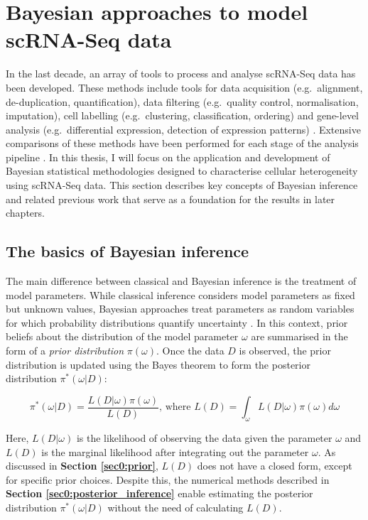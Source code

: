 
\section{Bayesian approaches to model scRNA-Seq data}

In the last decade, an array of tools to process and analyse scRNA-Seq data has been developed. These methods include tools for data acquisition (e.g.~alignment, de-duplication, quantification), data filtering (e.g.~quality control, normalisation, imputation), cell labelling (e.g.~clustering, classification, ordering) and gene-level analysis (e.g.~differential expression, detection of expression patterns) \citep{Zappia2018}. Extensive comparisons of these methods have been performed for each stage of the analysis pipeline \citep{Saelens2018, Soneson2018}. In this thesis, I will focus on the application and development of Bayesian statistical methodologies designed to characterise cellular heterogeneity using scRNA-Seq data. This section describes key concepts of Bayesian inference and related previous work that serve as a foundation for the results in later chapters.

\subsection{The basics of Bayesian inference}

The main difference between classical and Bayesian inference is the treatment of model parameters. While classical inference considers model parameters as fixed but unknown values, Bayesian approaches treat parameters as random variables for which probability distributions quantify uncertainty \citep{Bernardo2003}. In this context, prior beliefs about the distribution of the model parameter $\omega$ are summarised in the form of a \emph{prior distribution} $\pi(\omega)$. Once the data $D$ is observed, the prior distribution is updated using the Bayes theorem \cite{Bayes1763} to form the posterior distribution $\pi^*(\omega|D)$:

\begin{equation} \label{eq0:Bayes_theorem}
\pi^*(\omega|D)=\frac{L(D|\omega)\pi(\omega)}{L(D)}\text{, where }L(D)=\int_\omega{}L(D|\omega)\pi(\omega)d\omega 
\end{equation}

Here, $L(D|\omega)$ is the likelihood of observing the data given the parameter $\omega$ and $L(D)$ is the marginal likelihood after integrating out the parameter $\omega$. As discussed in \textbf{Section \ref{sec0:prior}}, $L(D)$ does not have a closed form, except for specific prior choices. Despite this, the numerical methods described in \textbf{Section \ref{sec0:posterior_inference}} enable estimating the posterior distribution $\pi^*(\omega|D)$ without the need of calculating $L(D)$.

